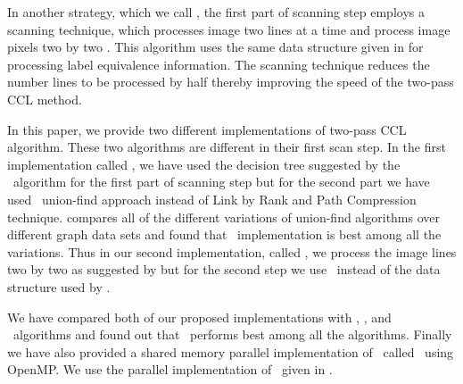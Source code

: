 In another strategy, which we call \arun, the first part of scanning step employs a scanning technique, which processes image two lines 
at a time and process image pixels two by two \cite{He2012_ARun}. This algorithm uses the same data structure given in
\cite{He2008_Run} for processing label equivalence information. The scanning technique reduces the number lines to be
processed by half thereby improving the speed of the two-pass CCL method. %

In this paper, we provide two different implementations of two-pass CCL algorithm. These two algorithms are different in their
first scan step. In the first implementation called \remsp, we have used the 
decision tree suggested by the \lrpc\ algorithm for the first part of scanning step but for the second part we have used
\rems\ union-find approach instead of Link by Rank and Path Compression technique.
\cite{Patwary2010_RemSP} compares all of the different variations of union-find algorithms over different graph data sets and found that
\rems\ implementation is best among all the variations. Thus in our second implementation, called \aremsp, we process the image lines
two by two as suggested by \cite{He2012_ARun} but for the second step
we use \remsp\ instead of the data structure used by \cite{He2012_ARun}.

We have compared both of our proposed implementations with \lrpc, \run, and \arun\ algorithms and found out that \aremsp\ performs best among all the algorithms.
Finally we have also provided a shared memory parallel implementation of \remsp\ called \aremsp\ using OpenMP.
We use the parallel implementation of \remsp\ given in \cite{Patwary2012_PARemSP}. 

